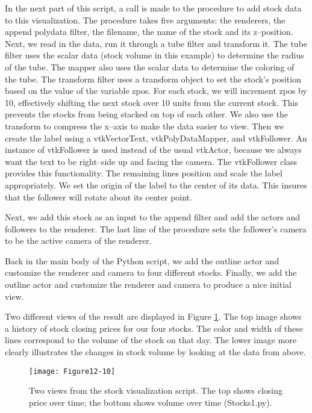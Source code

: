 In the next part of this script, a call is made to the procedure to add stock data to this visualization. The procedure takes five arguments: the renderers, the append polydata filter, the filename, the name of the stock and its z--position. Next, we read in the data, run it through a tube filter and transform it. The tube filter uses the scalar data (stock volume in this example) to determine the radius of the tube. The mapper also uses the scalar data to determine the coloring of the tube. The transform filter uses a transform object to set the stock's position based on the value of the variable zpos. For each stock, we will increment zpos by 10, effectively shifting the next stock over 10 units from the current stock. This prevents the stocks from being stacked on top of each other. We also use the transform to compress the x--axis to make the data easier to view.  Then we create the label using a vtkVectorText, vtkPolyDataMapper, and vtkFollower. An instance of vtkFollower is used instead of the usual vtkActor, because we always want the text to be right--side up and facing the camera. The vtkFollower class provides this functionality. The remaining lines position and scale the label appropriately. We set the origin of the label to the center of its data. This insures that the follower will rotate about its center point.

Next, we add this stock as an input to the append filter and add the actors and followers to the renderer. The last line of the procedure sets the follower's camera to be the active camera of the renderer.

Back in the main body of the Python script, we add the outline actor and customize the renderer and camera to  four different stocks. Finally, we add the outline actor and customize the renderer and camera to produce a nice initial view.

Two different views of the result are displayed in Figure \ref{fig:Figure12-10}. The top image shows a history of stock closing prices for our four stocks. The color and width of these lines correspond to the volume of the stock on that day. The lower image more clearly illustrates the changes in stock volume by looking at the data from above.

\begin{figure}[!htb]
    \centering
    \texttt{[image: Figure12-10]}
    \caption{Two views from the stock visualization script. The top shows closing price over time; the bottom shows volume over time (Stocks1.py).}
    \label{fig:Figure12-10}
\end{figure}

